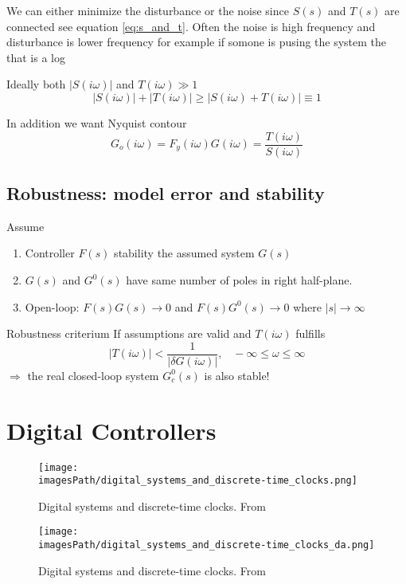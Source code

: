 We can either minimize the disturbance or the noise since $S(s)$ and $T(s)$ are connected
see equation \ref{eq:s_and_t}. Often the noise is high frequency and disturbance is lower
frequency for example if somone is pusing the system the that is a log

Ideally both $|S(i\omega)|$ and $T(i\omega) \gg 1$ 
\begin{equation*}
    |S(i\omega)| + |T(i\omega)| \geq |S(i\omega) + T(i\omega)| \equiv 1
\end{equation*}

In addition we want Nyquist contour
\begin{equation*}
    G_o(i\omega) = F_y(i\omega)G(i\omega) = \frac{T(i\omega)}{S(i\omega)}
\end{equation*}

\subsection{Robustness: model error and stability}
Assume
\begin{enumerate}
    \item Controller $F(s)$ stability the assumed system $G(s)$
    \item $G(s)$ and $G^0(s)$ have same number of poles in right half-plane.
    \item Open-loop: $F(s)G(s)\to0$ and $F(s)G^0(s)\to0$ where $|s|\to\infty$
\end{enumerate}

Robustness criterium 
If assumptions are valid and $T(i\omega)$ fulfills
\begin{equation*}
    |T(i\omega)| < \frac{1}{|\delta G(i\omega)|}, \;\;\; -\infty\leq\omega\leq\infty
\end{equation*}
$\Rightarrow$ the real closed-loop system $G^0_c(s)$ is also stable!


\section{Digital Controllers}
\begin{figure}[!h]
    \centering
    \texttt{[image: \\imagesPath/digital\_systems\_and\_discrete-time\_clocks.png]}
    \caption{Digital systems and discrete-time clocks. From \cite{}}
\end{figure}

\begin{figure}[!h]
    \centering
    \texttt{[image: \\imagesPath/digital\_systems\_and\_discrete-time\_clocks\_da.png]}
    \caption{Digital systems and discrete-time clocks. From \cite{}}
\end{figure}

